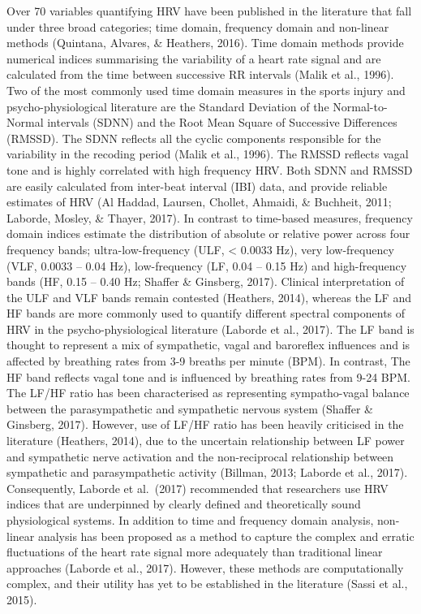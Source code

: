 \documentclass[
  english,
  man,floatsintext]{apa6}
\begin{document}
Over 70 variables quantifying HRV have been published in the literature that fall under three broad categories; time domain, frequency domain and non-linear methods (Quintana, Alvares, \& Heathers, 2016).
Time domain methods provide numerical indices summarising the variability of a heart rate signal and are calculated from the time between successive RR intervals (Malik et al., 1996).
Two of the most commonly used time domain measures in the sports injury and psycho-physiological literature are the Standard Deviation of the Normal-to-Normal intervals (SDNN) and the Root Mean Square of Successive Differences (RMSSD).
The SDNN reflects all the cyclic components responsible for the variability in the recoding period (Malik et al., 1996).
The RMSSD reflects vagal tone and is highly correlated with high frequency HRV.
Both SDNN and RMSSD are easily calculated from inter-beat interval (IBI) data, and provide reliable estimates of HRV (Al Haddad, Laursen, Chollet, Ahmaidi, \& Buchheit, 2011; Laborde, Mosley, \& Thayer, 2017).
In contrast to time-based measures, frequency domain indices estimate the distribution of absolute or relative power across four frequency bands; ultra-low-frequency (ULF, \textless{} 0.0033 Hz), very low-frequency (VLF, 0.0033 -- 0.04 Hz), low-frequency (LF, 0.04 -- 0.15 Hz) and high-frequency bands (HF, 0.15 -- 0.40 Hz; Shaffer \& Ginsberg, 2017).
Clinical interpretation of the ULF and VLF bands remain contested (Heathers, 2014), whereas the LF and HF bands are more commonly used to quantify different spectral components of HRV in the psycho-physiological literature (Laborde et al., 2017).
The LF band is thought to represent a mix of sympathetic, vagal and baroreflex influences and is affected by breathing rates from 3-9 breaths per minute (BPM). In contrast, The HF band reflects vagal tone and is influenced by breathing rates from 9-24 BPM.
The LF/HF ratio has been characterised as representing sympatho-vagal balance between the parasympathetic and sympathetic nervous system (Shaffer \& Ginsberg, 2017).
However, use of LF/HF ratio has been heavily criticised in the literature (Heathers, 2014), due to the uncertain relationship between LF power and sympathetic nerve activation and the non-reciprocal relationship between sympathetic and parasympathetic activity (Billman, 2013; Laborde et al., 2017).
Consequently, Laborde et al.~(2017) recommended that researchers use HRV indices that are underpinned by clearly defined and theoretically sound physiological systems.
In addition to time and frequency domain analysis, non-linear analysis has been proposed as a method to capture the complex and erratic fluctuations of the heart rate signal more adequately than traditional linear approaches (Laborde et al., 2017).
However, these methods are computationally complex, and their utility has yet to be established in the literature (Sassi et al., 2015).
\end{document}
